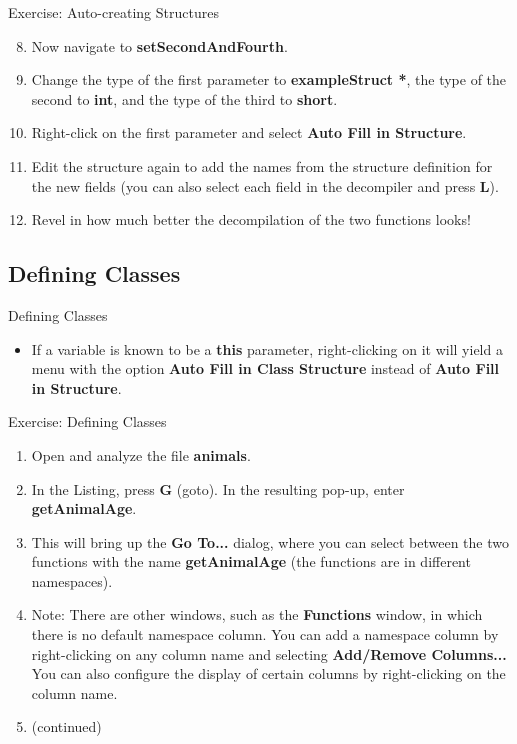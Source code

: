 \documentclass{beamer}
\begin{document}
\begin{frame}
\begin{block}{Exercise: Auto-creating Structures}
\begin{enumerate}
\setcounter{enumi}{7}
\item Now navigate to \textbf{setSecondAndFourth}.
\item Change the type of the first parameter to \textbf{exampleStruct *}, the type of the second to \textbf{int}, and the type of the third to \textbf{short}.
\item Right-click on the first parameter and select \textbf{Auto Fill in Structure}.
\item Edit the structure again to add the names from the structure definition for the new fields (you can also select each field in the decompiler and press \textbf{L}).
\item Revel in how much better the decompilation of the two functions looks!
\end{enumerate}
\end{block}
\end{frame}

\subsection{Defining Classes}
\begin{frame}
\begin{block}{Defining Classes}
\begin{itemize}
\item If a variable is known to be a \textbf{this} parameter, right-clicking on it will yield a menu with the option \textbf{Auto Fill in Class Structure} instead 
of \textbf{Auto Fill in Structure}.
\end{itemize}
\end{block}
\end{frame}

\begin{frame}
\begin{block}{Exercise: Defining Classes}
\begin{enumerate}
\item Open and analyze the file \textbf{animals}.
\item In the Listing, press \textbf{G} (goto).  In the resulting pop-up, enter \textbf{getAnimalAge}.  \item This will bring up the \textbf{Go To...} dialog, where you can 
select between the two functions with the name \textbf{getAnimalAge} (the functions are in different namespaces).
\item[] Note: There are other windows, such as the \textbf{Functions} window, in which there is no default namespace column.  You can add a namespace column by right-clicking 
on any column name and selecting \textbf{Add/Remove Columns...}  You can also configure the display of certain columns by right-clicking on the column name.
\item[] (continued)
\end{enumerate}
\end{block}
\end{frame}
\end{document}
